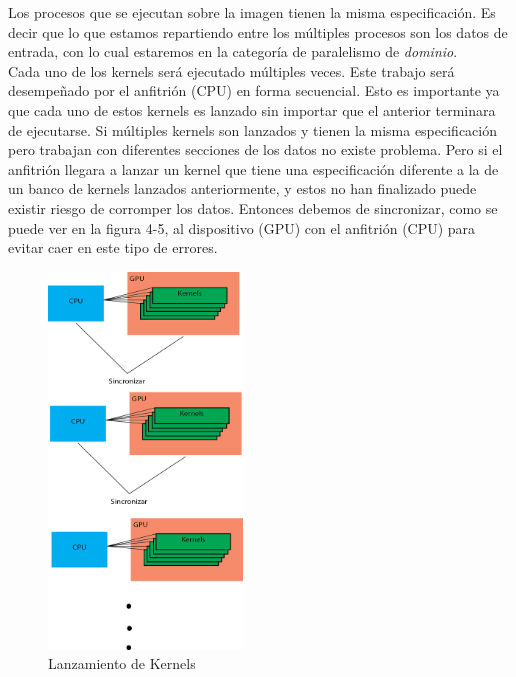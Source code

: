 Los procesos que se ejecutan sobre la imagen tienen la misma especificación. Es decir que lo que estamos repartiendo entre los múltiples procesos son los datos de entrada, con lo cual estaremos en la categoría de paralelismo de \textit{dominio}.\\
Cada uno de los kernels será ejecutado múltiples veces. Este trabajo será desempeñado por el anfitrión (CPU) en forma secuencial. Esto es importante ya que cada uno de estos kernels es lanzado sin importar que el anterior terminara de ejecutarse. Si múltiples kernels son lanzados y tienen la misma especificación pero trabajan con diferentes secciones de los datos no existe problema. Pero si el anfitrión llegara a lanzar un kernel que tiene una especificación diferente a la de un banco de kernels lanzados anteriormente, y estos no han finalizado puede existir riesgo de corromper los datos. Entonces debemos de sincronizar, como se puede ver en la figura 4-5, al  dispositivo (GPU) con el anfitrión (CPU) para evitar caer en este tipo de errores.\\
\begin{figure}[H]
			\centering
				\includegraphics[height=10cm]{img/lanzamiento.jpg}
			\caption{Lanzamiento de Kernels}
\end{figure}
